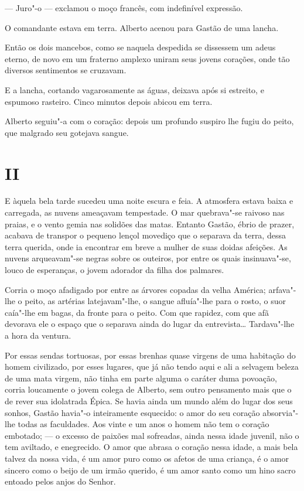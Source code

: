 --- Juro"-o --- exclamou o moço francês, com indefinível expressão.

O comandante estava em terra. Alberto acenou para Gastão de uma lancha.

Então os dois mancebos, como se naquela despedida se dissessem um adeus
eterno, de novo em um fraterno amplexo uniram seus jovens corações, onde
tão diversos sentimentos se cruzavam.

E a lancha, cortando vagarosamente as águas, deixava após si estreito, e
espumoso rasteiro. Cinco minutos depois abicou em terra.

Alberto seguiu"-a com o coração: depois um profundo suspiro lhe fugiu do
peito, que malgrado seu gotejava sangue.

\section{II}

E àquela bela tarde sucedeu uma noite escura e feia. A atmosfera estava
baixa e carregada, as nuvens ameaçavam tempestade. O mar quebrava"-se
raivoso nas praias, e o vento gemia nas solidões das matas. Entanto
Gastão, ébrio de prazer, acabava de transpor o pequeno lençol movediço
que o separava da terra, dessa terra querida, onde ia encontrar em breve
a mulher de suas doidas afeições. As nuvens arqueavam"-se negras sobre os
outeiros, por entre os quais insinuava"-se, louco de esperanças, o jovem
adorador da filha dos palmares.

Corria o moço afadigado por entre as árvores copadas da velha América;
arfava"-lhe o peito, as artérias latejavam"-lhe, o sangue afluía"-lhe para
o rosto, o suor caía"-lhe em bagas, da fronte para o peito. Com que
rapidez, com que afã devorava ele o espaço que o separava ainda do lugar
da entrevista\ldots{} Tardava"-lhe a hora da ventura.

Por essas sendas tortuosas, por essas brenhas quase virgens de uma
habitação do homem civilizado, por esses lugares, que já não tendo aqui
e ali a selvagem beleza de uma mata virgem, não tinha em parte alguma o
caráter duma povoação, corria loucamente o jovem colega de Alberto, sem
outro pensamento mais que o de rever sua idolatrada Épica. Se havia
ainda um mundo além do lugar dos seus sonhos, Gastão havia"-o
inteiramente esquecido: o amor do seu coração absorvia"-lhe todas as
faculdades. Aos vinte e um anos o homem não tem o coração embotado; --- o
excesso de paixões mal sofreadas, ainda nessa idade juvenil, não o tem
aviltado, e enegrecido. O amor que abrasa o coração nessa idade, a mais
bela talvez da nossa vida, é um amor puro como os afetos de uma criança,
é o amor sincero como o beijo de um irmão querido, é um amor santo como
um hino sacro entoado pelos anjos do Senhor.

